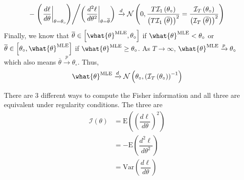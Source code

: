 \documentclass[answers]{exam}
\begin{document}
\begin{questions}
\begin{solution}
\begin{enumerate}[a)]
\begin{itemize}
      \begin{equation}
        -\left.\left(\left.\dfrac{d\ell}{d\theta}\right|_{\theta=\theta_{\circ}}\right)\middle/\left(\left.\dfrac{d^{2}\ell}{d\theta^{2}}\right|_{\theta=\overline{\theta}}\right)\right. \xrightarrow{d} \mathcal{N}\left(0,\dfrac{T\mathcal{I}_{1}\left(\theta_{\circ}\right)}{\left(T\mathcal{I}_{1}\left(\overline{\theta}\right)\right)^{2}}=\dfrac{\mathcal{I}_{T}\left(\theta_{\circ}\right)}{\left(\mathcal{I}_{T}\left(\overline{\theta}\right)\right)^{2}}\right)
      \end{equation}
      Finally, we know that $\overline{\theta}\in \left[\what{\theta}^{\text{MLE}},\theta_{\circ}\right]$ if $\what{\theta}^{\text{MLE}} < \theta_{\circ}$ or $\overline{\theta}\in \left[\theta_{\circ},\what{\theta}^{\text{MLE}}\right]$ if $\what{\theta}^{\text{MLE}} \geq \theta_{\circ}$. As $T\to\infty$, $\what{\theta}^{\text{MLE}}\xrightarrow{p}\theta_{\circ}$ which also means $\overline{\theta}\xrightarrow{p}\theta_{\circ}$. Thus,
      \begin{equation}
        \what{\theta}^{\text{MLE}} \xrightarrow{d} \mathcal{N}\left(\theta_{\circ},\left(\mathcal{I}_{T}\left(\theta_{\circ}\right)\right)^{-1}\right)
      \end{equation}
      \end{itemize}
    \end{enumerate}
    There are 3 different ways to compute the Fisher information and all three are equivalent under regularity conditions. The three are
    \begin{align}
      \mathcal{I}\left(\theta\right) &= \mathrm{E}\left(\left(\dfrac{d\ell}{d\theta}\right)^{2}\right)\\
      &= -\mathrm{E}\left(\dfrac{d^{2}\ell}{d\theta^{2}}\right)\\
      &= \mathrm{Var}\left(\dfrac{d\ell}{d\theta}\right)
    \end{align}
  \end{solution}
  \end{questions}
\end{document}
